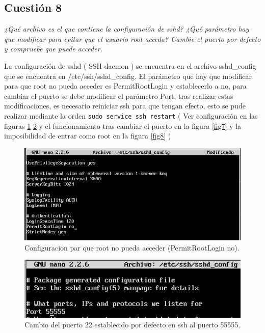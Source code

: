 \subsection{Cuestión 8}
\textit{¿Qué archivo es el que contiene la configuración de sshd? ¿Qué parámetro hay que modificar para evitar que el usuario root acceda? Cambie el puerto por defecto y compruebe que puede acceder.}
\newline

La configuración de sshd ( SSH daemon ) se encuentra en el archivo sshd\_config que se encuentra en /etc/ssh/sshd\_config. El parámetro que hay que modificar para que root no pueda acceder es PermitRootLogin y establecerlo a no, para cambiar el puerto se debe modificar el parámetro Port, tras realizar estas modificaciones, es necesario reiniciar ssh para que tengan efecto, esto se pude realizar mediante la orden \texttt{sudo service ssh restart} ( Ver configuración en las figuras \ref{fig5} \ref{fig6} y el funcionamiento tras cambiar el puerto en la figura \ref{fig7} y la imposibilidad de entrar como root en la figura \ref{fig8} ) \cite{sshd}

\begin{figure}[H]
    \begin{center}
        \includegraphics[scale=0.6]{imagenes/img5}
        \caption{Configuracion par que root no pueda acceder (PermitRootLogin no).}
        \label{fig5}
    \end{center}
\end{figure}

\begin{figure}[H]
    \begin{center}
        \includegraphics[scale=0.7]{imagenes/img7}
        \caption{Cambio del puerto 22 establecido por defecto en ssh al puerto 55555.}
        \label{fig6}
    \end{center}
\end{figure}

